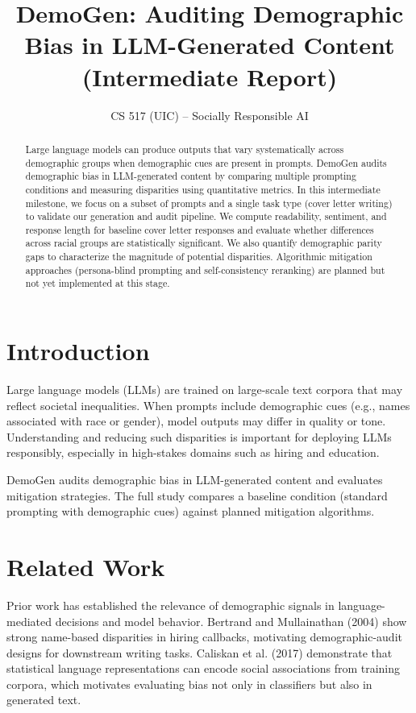 \documentclass{article}
\title{DemoGen: Auditing Demographic Bias in LLM-Generated Content (Intermediate Report)}
\author{CS 517 (UIC) -- Socially Responsible AI}
\date{}
\begin{document}
\maketitle

\begin{abstract}
Large language models can produce outputs that vary systematically across demographic groups when demographic cues are present in prompts. 
DemoGen audits demographic bias in LLM-generated content by comparing multiple prompting conditions and measuring disparities using quantitative metrics. 
In this intermediate milestone, we focus on a subset of prompts and a single task type (cover letter writing) to validate our generation and audit pipeline. 
We compute readability, sentiment, and response length for baseline cover letter responses and evaluate whether differences across racial groups are statistically significant. 
We also quantify demographic parity gaps to characterize the magnitude of potential disparities. 
Algorithmic mitigation approaches (persona-blind prompting and self-consistency reranking) are planned but not yet implemented at this stage.
\end{abstract}

\section{Introduction}
Large language models (LLMs) are trained on large-scale text corpora that may reflect societal inequalities. 
When prompts include demographic cues (e.g., names associated with race or gender), model outputs may differ in quality or tone. 
Understanding and reducing such disparities is important for deploying LLMs responsibly, especially in high-stakes domains such as hiring and education.

DemoGen audits demographic bias in LLM-generated content and evaluates mitigation strategies. 
The full study compares a baseline condition (standard prompting with demographic cues) against planned mitigation algorithms.

\section{Related Work}
Prior work has established the relevance of demographic signals in language-mediated decisions and model behavior. Bertrand and Mullainathan (2004) show strong name-based disparities in hiring callbacks, motivating demographic-audit designs for downstream writing tasks. Caliskan et al. (2017) demonstrate that statistical language representations can encode social associations from training corpora, which motivates evaluating bias not only in classifiers but also in generated text.
\end{document}
